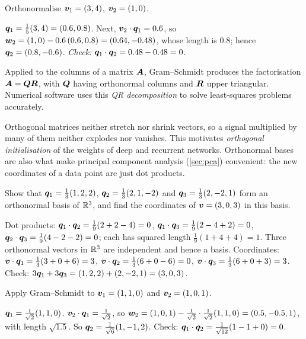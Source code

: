 \begin{example}
Orthonormalise $\bm{v}_1 = (3, 4)$, $\bm{v}_2 = (1, 0)$.

\sol $\bm{q}_1 = \frac15(3, 4) = (0.6, 0.8)$. Next,
$\bm{v}_2\cdot\bm{q}_1 = 0.6$, so $\bm{w}_2 = (1, 0) - 0.6\,(0.6, 0.8) = (0.64, -0.48)$,
whose length is $0.8$; hence $\bm{q}_2 = (0.8, -0.6)$.
\emph{Check:} $\bm{q}_1\cdot\bm{q}_2 = 0.48 - 0.48 = 0$. \checkmark
\end{example}

Applied to the columns of a matrix $\bm{A}$, Gram--Schmidt produces the
factorisation $\bm{A} = \bm{Q}\bm{R}$, with $\bm{Q}$ having orthonormal columns and $\bm{R}$
upper triangular. Numerical software uses this \emph{QR decomposition} to
solve least-squares problems accurately.

\begin{mlnote}
Orthogonal matrices neither stretch nor shrink vectors, so a signal multiplied
by many of them neither explodes nor vanishes. This motivates \emph{orthogonal
initialisation} of the weights of deep and recurrent networks. Orthonormal
bases are also what make principal component analysis (\cref{sec:pca})
convenient: the new coordinates of a data point are just dot products.
\end{mlnote}

\sectionexercises

\begin{exercise}
Show that $\bm{q}_1 = \frac13(1, 2, 2)$, $\bm{q}_2 = \frac13(2, 1, -2)$ and
$\bm{q}_3 = \frac13(2, -2, 1)$ form an orthonormal basis of $\mathbb{R}^3$, and find the
coordinates of $\bm{v} = (3, 0, 3)$ in this basis.
\end{exercise}
\begin{solution}
Dot products: $\bm{q}_1\cdot\bm{q}_2 = \tfrac19(2 + 2 - 4) = 0$,
$\bm{q}_1\cdot\bm{q}_3 = \tfrac19(2 - 4 + 2) = 0$, $\bm{q}_2\cdot\bm{q}_3 = \tfrac19(4 - 2 - 2)
= 0$; each has squared length $\tfrac19(1 + 4 + 4) = 1$. Three orthonormal
vectors in $\mathbb{R}^3$ are independent and hence a basis. Coordinates:
$\bm{v}\cdot\bm{q}_1 = \tfrac13(3 + 0 + 6) = 3$, $\bm{v}\cdot\bm{q}_2 = \tfrac13(6 + 0 - 6) =
0$, $\bm{v}\cdot\bm{q}_3 = \tfrac13(6 + 0 + 3) = 3$. Check: $3\bm{q}_1 + 3\bm{q}_3 = (1, 2,
2) + (2, -2, 1) = (3, 0, 3)$.
\end{solution}

\begin{exercise}
Apply Gram--Schmidt to $\bm{v}_1 = (1, 1, 0)$ and $\bm{v}_2 = (1, 0, 1)$.
\end{exercise}
\begin{solution}
$\bm{q}_1 = \tfrac{1}{\sqrt2}(1, 1, 0)$. $\bm{v}_2\cdot\bm{q}_1 = \tfrac{1}{\sqrt2}$, so
$\bm{w}_2 = (1, 0, 1) - \tfrac{1}{\sqrt2}\cdot\tfrac{1}{\sqrt2}(1, 1, 0) = (0.5,
-0.5, 1)$, with length $\sqrt{1.5}$. So $\bm{q}_2 = \tfrac{1}{\sqrt{6}}(1, -1, 2)$.
Check: $\bm{q}_1\cdot\bm{q}_2 = \tfrac{1}{\sqrt{12}}(1 - 1 + 0) = 0$.
\end{solution}

